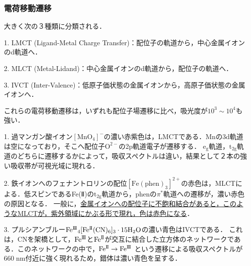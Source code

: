 \documentclass[uplatex, dvipdfmx]{jsreport}
\begin{document}
\subsubsection{電荷移動遷移}

\begin{theory}[電荷移動遷移]
    大きく次の３種類に分類される．

    1. LMCT (Ligand-Metal Charge Transfer)：配位子の軌道から，中心金属イオンのd軌道へ．

    2. MLCT (Metal-Lidand)：中心金属イオンのd軌道から，配位子の軌道へ．

    3. IVCT (Inter-Valence)：低原子価状態の金属イオンから，高原子価状態の金属イオンへ．

    これらの電荷移動遷移は，いずれも配位子場遷移に比べ，吸光度が$10^3\sim 10^4$も強い．
\end{theory}
\begin{example}
    
    1. 過マンガン酸イオン$[\mathrm{MnO_4}]^-$の濃い赤紫色は，LMCTである．Mnの3d軌道は空になっており，そこへ配位子$\mathrm{O}^{2-}$の2p軌道電子が遷移する．
    $\mathrm{e_g}$軌道，$\mathrm{t_{2g}}$軌道のどちらに遷移するかによって，吸収スペクトルは違い，結果として２本の強い吸収帯が可視光域に現れる．

    2. 鉄イオンへのフェナントロリンの配位$[\mathrm{Fe(phen)_3}]^{2+}$の赤色は，MLCTによる．低スピンであるFe(Ⅱ)の$\mathrm{t_{2g}}$軌道から，phenの$\pi^*$軌道への遷移が，濃い赤色の原因となる．
    一般に，\underline{金属イオンへの配位子に不飽和結合があると，このようなMLCTが，紫外領域にかぶる形で現れ，色は赤色になる}．

    3. プルシアンブルー$\mathrm{Fe^{I\hspace{-.1em}I\hspace{-.1em}I}}_4[\mathrm{Fe^{I\hspace{-.1em}I}(CN)_6}]_3\cdot \mathrm{15H_2O}$の濃い青色はIVCTである．
    これは，CNを架橋として，$\mathrm{Fe^{I\hspace{-.1em}I\hspace{-.1em}I}}$と$\mathrm{Fe^{I\hspace{-.1em}I}}$が交互に結合した立方体のネットワークである．このネットワークの中で，$\mathrm{Fe^{I\hspace{-.1em}I}}\to\mathrm{Fe^{I\hspace{-.1em}I\hspace{-.1em}I}}$
    という遷移による吸収スペクトルが$660\;\mathrm{nm}$付近に強く現れるため，錯体は濃い青色を呈する．
\end{example}
\end{document}

